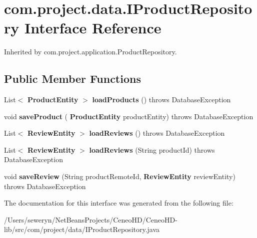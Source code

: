 \section{com.\+project.\+data.\+I\+Product\+Repository Interface Reference}
\label{interfacecom_1_1project_1_1data_1_1_i_product_repository}


Inherited by com.\+project.\+application.\+Product\+Repository.

\subsection*{Public Member Functions}
\begin{DoxyCompactItemize}
\item 
\mbox{\label{interfacecom_1_1project_1_1data_1_1_i_product_repository_a15b29fc47dcd717875ab44fb8515b375}} 
List$<$ \textbf{ Product\+Entity} $>$ {\bfseries load\+Products} ()  throws Database\+Exception
\item 
\mbox{\label{interfacecom_1_1project_1_1data_1_1_i_product_repository_ae14b09625a3a064a9d704616c7c985ca}} 
void {\bfseries save\+Product} (\textbf{ Product\+Entity} product\+Entity)  throws Database\+Exception
\item 
\mbox{\label{interfacecom_1_1project_1_1data_1_1_i_product_repository_ac746a86ef50e372a012cccafd770f46e}} 
List$<$ \textbf{ Review\+Entity} $>$ {\bfseries load\+Reviews} ()  throws Database\+Exception
\item 
\mbox{\label{interfacecom_1_1project_1_1data_1_1_i_product_repository_a050aae86dced46c7be6fbbdc7c995878}} 
List$<$ \textbf{ Review\+Entity} $>$ {\bfseries load\+Reviews} (String product\+Id)  throws Database\+Exception
\item 
\mbox{\label{interfacecom_1_1project_1_1data_1_1_i_product_repository_a4449c98818575c412b4cee40f601ffcd}} 
void {\bfseries save\+Review} (String product\+Remote\+Id, \textbf{ Review\+Entity} review\+Entity)  throws Database\+Exception
\end{DoxyCompactItemize}


The documentation for this interface was generated from the following file\+:\begin{DoxyCompactItemize}
\item 
/\+Users/seweryn/\+Net\+Beans\+Projects/\+Ceneo\+H\+D/\+Ceneo\+H\+D-\/lib/src/com/project/data/I\+Product\+Repository.\+java\end{DoxyCompactItemize}
